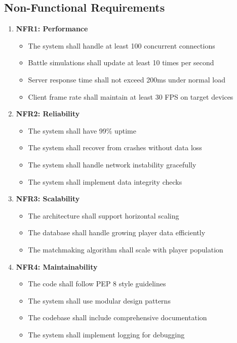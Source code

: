 \documentclass{article}
\begin{document}
\subsection{Non-Functional Requirements}

\begin{enumerate}
    \item \textbf{NFR1: Performance}
    \begin{itemize}
        \item The system shall handle at least 100 concurrent connections
        \item Battle simulations shall update at least 10 times per second
        \item Server response time shall not exceed 200ms under normal load
        \item Client frame rate shall maintain at least 30 FPS on target devices
    \end{itemize}

    \item \textbf{NFR2: Reliability}
    \begin{itemize}
        \item The system shall have 99\% uptime
        \item The system shall recover from crashes without data loss
        \item The system shall handle network instability gracefully
        \item The system shall implement data integrity checks
    \end{itemize}

    \item \textbf{NFR3: Scalability}
    \begin{itemize}
        \item The architecture shall support horizontal scaling
        \item The database shall handle growing player data efficiently
        \item The matchmaking algorithm shall scale with player population
    \end{itemize}

    \item \textbf{NFR4: Maintainability}
    \begin{itemize}
        \item The code shall follow PEP 8 style guidelines
        \item The system shall use modular design patterns
        \item The codebase shall include comprehensive documentation
        \item The system shall implement logging for debugging
    \end{itemize}


\end{enumerate}
\end{document}

